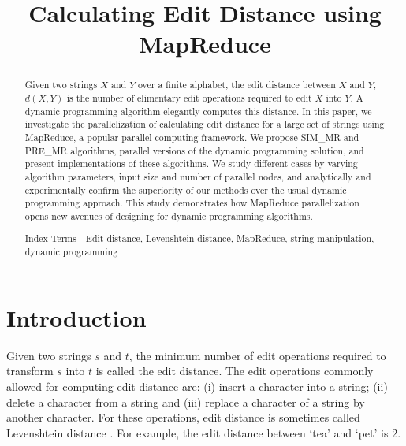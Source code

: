 \documentclass[conference]{IEEEtran}
\begin{document}
%
\title{Calculating Edit Distance using MapReduce}


\author{
\and
{}
}




\maketitle
\thispagestyle{plain}
\pagestyle{plain}


\begin{abstract}
Given two strings $X$ and $Y$ over a finite alphabet, the edit distance between $X$ and $Y$, $d(X, Y)$ is the number of elimentary edit operations required to edit $X$ into $Y$. A dynamic programming algorithm elegantly computes this distance. In this paper, we investigate the parallelization of calculating edit distance for a large set of strings using MapReduce, a popular parallel computing framework. We propose SIM\_MR and PRE\_MR algorithms, parallel versions of the dynamic programming solution, and present implementations of these algorithms. We study different cases by varying algorithm parameters, input size and number of parallel nodes, and analytically and experimentally confirm the superiority of our methods over the usual dynamic programming approach. This study demonstrates how MapReduce parallelization opens new avenues of designing for dynamic programming algorithms.

Index Terms - Edit distance, Levenshtein distance, MapReduce, string manipulation, dynamic programming
\end{abstract}
\IEEEpeerreviewmaketitle


\section{Introduction}
Given two strings $s$ and $t$, the minimum number of edit operations required to transform $s$ into $t$ is called the edit distance. The edit operations commonly allowed for computing edit distance are: (i) insert a character into a string; (ii) delete a character from a string and (iii) replace a character of a string by another character. For these operations, edit distance is sometimes called Levenshtein distance \cite{edit-stanford}. For example, the edit distance between `tea' and `pet' is 2.
\end{document}
